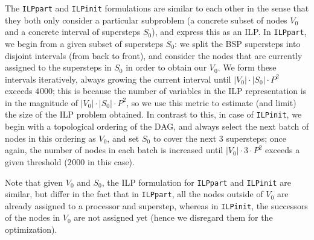 \documentclass[sigconf,nonacm]{acmart}
\begin{document}
The \texttt{ILPpart} and \texttt{ILPinit} formulations are similar to each other in the sense that they both only consider a particular subproblem (a concrete subset of nodes $V_0$ and a concrete interval of supersteps $S_0$), and express this as an ILP. In \texttt{ILPpart}, we begin from a given subset of supersteps $S_0$: we split the BSP supersteps into disjoint intervals (from back to front), and consider the nodes that are currently assigned to the supersteps in $S_0$ in order to obtain our $V_0$. We form these intervals iteratively, always growing the current interval until $|V_0| \cdot |S_0| \cdot P^2$ exceeds $4_{\!}000$; this is because the number of variables in the ILP representation is in the magnitude of $|V_0| \cdot |S_0| \cdot P^2$, so we use this metric to estimate (and limit) the size of the ILP problem obtained. In contrast to this, in case of \texttt{ILPinit}, we begin with a topological ordering of the DAG, and always select the next batch of nodes in this ordering as $V_0$, and set $S_0$ to cover the next $3$ supersteps; once again, the number of nodes in each batch is increased until $|V_0| \cdot 3 \cdot P^2$ exceeds a given threshold ($2_{\!}000$ in this case).

Note that given $V_0$ and $S_0$, the ILP formulation for \texttt{ILPpart} and \texttt{ILPinit} are similar, but differ in the fact that in \texttt{ILPpart}, all the nodes outside of $V_0$ are already assigned to a processor and superstep, whereas in \texttt{ILPinit}, the successors of the nodes in $V_0$ are not assigned yet (hence we disregard them for the optimization).
\end{document}

